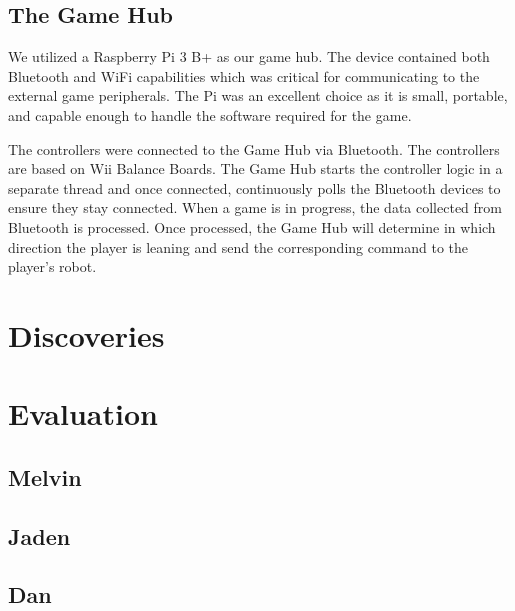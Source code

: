 \documentclass[11pt]{ieeeconf}
\begin{document}
\subsection{The Game Hub}

We utilized a Raspberry Pi 3 B+ as our game hub. The device contained both Bluetooth and WiFi capabilities which was critical for communicating to the external game peripherals. The Pi was an excellent choice as it is small, portable, and capable enough to handle the software required for the game. 

The controllers were connected to the Game Hub via Bluetooth. The controllers are based on Wii Balance Boards. The Game Hub starts the controller logic in a separate thread and once connected, continuously polls the Bluetooth devices to ensure they stay connected. When a game is in progress, the data collected from Bluetooth is processed. Once processed, the Game Hub will determine in which direction the player is leaning and send the corresponding command to the player's robot.

\section{Discoveries}

\section{Evaluation}

\subsection{Melvin}

\subsection{Jaden}

\subsection{Dan}
\end{document}
